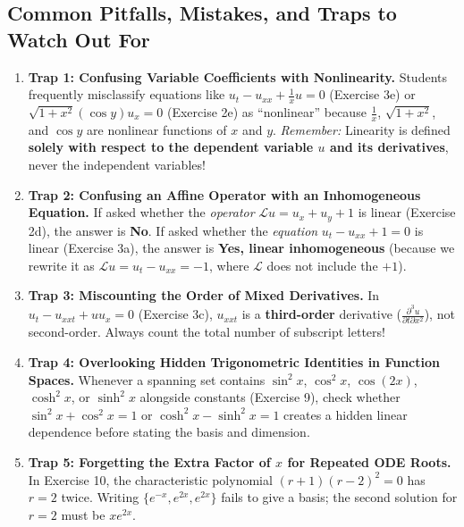 \documentclass[11pt,a4paper]{article}
\begin{document}
\subsection{Common Pitfalls, Mistakes, and Traps to Watch Out For}
\begin{enumerate}
    \item \textbf{Trap 1: Confusing Variable Coefficients with Nonlinearity.} Students frequently misclassify equations like $u_t - u_{xx} + \frac{1}{x}u = 0$ (Exercise 3e) or $\sqrt{1+x^2}(\cos y)u_x = 0$ (Exercise 2e) as ``nonlinear'' because $\frac{1}{x}$, $\sqrt{1+x^2}$, and $\cos y$ are nonlinear functions of $x$ and $y$. \emph{Remember:} Linearity is defined \textbf{solely with respect to the dependent variable $u$ and its derivatives}, never the independent variables!
    \item \textbf{Trap 2: Confusing an Affine Operator with an Inhomogeneous Equation.} If asked whether the \emph{operator} $\mathcal{L}u = u_x + u_y + 1$ is linear (Exercise 2d), the answer is \textbf{No}. If asked whether the \emph{equation} $u_t - u_{xx} + 1 = 0$ is linear (Exercise 3a), the answer is \textbf{Yes, linear inhomogeneous} (because we rewrite it as $\mathcal{L}u = u_t - u_{xx} = -1$, where $\mathcal{L}$ does not include the $+1$).
    \item \textbf{Trap 3: Miscounting the Order of Mixed Derivatives.} In $u_t - u_{xxt} + u u_x = 0$ (Exercise 3c), $u_{xxt}$ is a \textbf{third-order} derivative ($\frac{\partial^3 u}{\partial t \partial x^2}$), not second-order. Always count the total number of subscript letters!
    \item \textbf{Trap 4: Overlooking Hidden Trigonometric Identities in Function Spaces.} Whenever a spanning set contains $\sin^2 x$, $\cos^2 x$, $\cos(2x)$, $\cosh^2 x$, or $\sinh^2 x$ alongside constants (Exercise 9), check whether $\sin^2 x + \cos^2 x = 1$ or $\cosh^2 x - \sinh^2 x = 1$ creates a hidden linear dependence before stating the basis and dimension.
    \item \textbf{Trap 5: Forgetting the Extra Factor of $x$ for Repeated ODE Roots.} In Exercise 10, the characteristic polynomial $(r+1)(r-2)^2 = 0$ has $r=2$ twice. Writing $\{e^{-x}, e^{2x}, e^{2x}\}$ fails to give a basis; the second solution for $r=2$ must be $x e^{2x}$.
\end{enumerate}

\newpage
\end{document}
